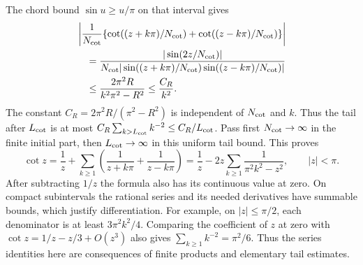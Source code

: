 The chord bound $\sin u\geq u/\pi$ on that interval gives
\[
 \begin{aligned}
 &\left|\frac{1}{N_{\rm cot}}\{\cot((z+k\pi)/N_{\rm cot})+\cot((z-k\pi)/N_{\rm cot})\}\right|\\
 &\quad=\frac{|\sin(2z/N_{\rm cot})|}
       {N_{\rm cot}|\sin((z+k\pi)/N_{\rm cot})\sin((z-k\pi)/N_{\rm cot})|}\\
 &\quad\leq\frac{2\pi^2R}{k^2\pi^2-R^2}\leq\frac{C_R}{k^2}.
 \end{aligned}
\]
The constant $C_R=2\pi^2R/(\pi^2-R^2)$ is independent of $N_{\rm cot}$ and $k$.
Thus the tail after $L_{\rm cot}$ is at most $C_R\sum_{k>L_{\rm cot}}k^{-2}\leq C_R/L_{\rm cot}$.
Pass first $N_{\rm cot}\to\infty$ in the finite initial part, then
$L_{\rm cot}\to\infty$ in this uniform tail bound. This proves
\[
 \cot z=\frac1z+\sum_{k\geq1}
       \left(\frac1{z+k\pi}+\frac1{z-k\pi}\right)
 =\frac1z-2z\sum_{k\geq1}\frac1{\pi^2k^2-z^2},\qquad |z|<\pi.
\]
After subtracting $1/z$ the formula also has its continuous value at
zero. On compact subintervals the rational series and its needed
derivatives have summable bounds, which justify differentiation.
For example, on $|z|\leq\pi/2$, each denominator is at least
$3\pi^2k^2/4$. Comparing the coefficient of $z$ at zero with
$\cot z=1/z-z/3+O(z^3)$ also gives
$\sum_{k\geq1}k^{-2}=\pi^2/6$. Thus the series identities here
are consequences of finite products and elementary tail estimates.

